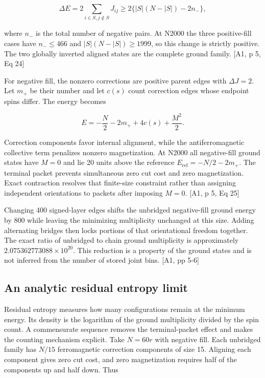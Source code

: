 \[\Delta E=2\sum_{i\in S,j\notin S}J_{ij}\geq 2\{|S|(N-|S|)-2n_-\},\]

where \(n_-\) is the total number of negative pairs. At N2000 the three positive-fill cases have \(n_-\leq466\) and \(|S|(N-|S|)\geq1999\), so this change is strictly positive. The two globally inverted aligned states are the complete ground family. {[}A1, p 5, Eq 24{]}

For negative fill, the nonzero corrections are positive parent edges with \(\Delta J=2\). Let \(m_+\) be their number and let \(c(s)\) count correction edges whose endpoint spins differ. The energy becomes

\[E=-\frac{N}{2}-2m_++4c(s)+\frac{M^2}{2}.\]

Correction components favor internal alignment, while the antiferromagnetic collective term penalizes nonzero magnetization. At N2000 all negative-fill ground states have \(M=0\) and lie 20 units above the reference \(E_{\mathrm{ref}}=-N/2-2m_+\). The terminal packet prevents simultaneous zero cut cost and zero magnetization. Exact contraction resolves that finite-size constraint rather than assigning independent orientations to packets after imposing \(M=0\). {[}A1, p 5, Eq 25{]}

Changing 400 signed-layer edges shifts the unbridged negative-fill ground energy by 800 while leaving the minimizing multiplicity unchanged at this size. Adding alternating bridges then locks portions of that orientational freedom together. The exact ratio of unbridged to chain ground multiplicity is approximately \(2.075362773088\times10^{20}\). This reduction is a property of the ground states and is not inferred from the number of stored joint bins. {[}A1, pp 5-6{]}

\subsection{An analytic residual entropy limit}\label{an-analytic-residual-entropy-limit}

Residual entropy measures how many configurations remain at the minimum energy. Its density is the logarithm of the ground multiplicity divided by the spin count. A commensurate sequence removes the terminal-packet effect and makes the counting mechanism explicit. Take \(N=60r\) with negative fill. Each unbridged family has \(N/15\) ferromagnetic correction components of size 15. Aligning each component gives zero cut cost, and zero magnetization requires half of the components up and half down. Thus

